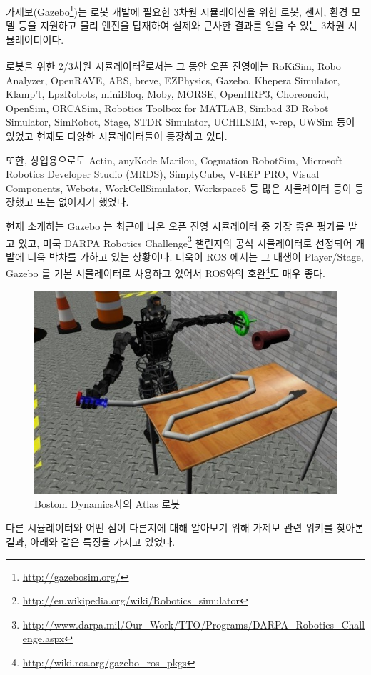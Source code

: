 가제보(Gazebo\footnote{\url{http://gazebosim.org/}})는 로봇 개발에 필요한 3차원 시뮬레이션을 위한 로봇, 센서, 환경 모델 등을 지원하고 물리 엔진을 탑재하여 실제와 근사한 결과를 얻을 수 있는 3차원 시뮬레이터이다. 

로봇을 위한 2/3차원 시뮬레이터\footnote{\url{http://en.wikipedia.org/wiki/Robotics_simulator}}로서는 그 동안 오픈 진영에는  RoKiSim, Robo Analyzer, OpenRAVE, ARS, breve, EZPhysics, Gazebo, Khepera Simulator, Klamp't, LpzRobots, miniBloq, Moby, MORSE, OpenHRP3, Choreonoid, OpenSim, ORCASim, Robotics Toolbox for MATLAB, Simbad 3D Robot Simulator, SimRobot, Stage, STDR Simulator, UCHILSIM, v-rep, UWSim 등이 있었고 현재도 다양한 시뮬레이터들이 등장하고 있다.

또한, 상업용으로도 Actin, anyKode Marilou, Cogmation RobotSim, Microsoft Robotics Developer Studio (MRDS), SimplyCube, V-REP PRO, Visual Components, Webots, WorkCellSimulator, Workspace5 등 많은 시뮬레이터 등이 등장했고 또는 없어지기 했었다. 

현재 소개하는 Gazebo 는 최근에 나온 오픈 진영 시뮬레이터 중 가장 좋은 평가를 받고 있고, 미국 DARPA Robotics Challenge\footnote{\url{http://www.darpa.mil/Our_Work/TTO/Programs/DARPA_Robotics_Challenge.aspx}} 챌린지의 공식 시뮬레이터로 선정되어 개발에 더욱 박차를 가하고 있는 상황이다. 더욱이 ROS 에서는 그 태생이 Player/Stage, Gazebo 를 기본 시뮬레이터로 사용하고 있어서 ROS와의 호완\footnote{\url{http://wiki.ros.org/gazebo_ros_pkgs}}도 매우 좋다.

\begin{figure}[h]
\centering\includegraphics[width=0.7\columnwidth]{pictures/chapter10/darpa_hose_atlas.jpg}
\caption{Bostom Dynamics사의 Atlas 로봇}
\end{figure}

다른 시뮬레이터와 어떤 점이 다른지에 대해 알아보기 위해 가제보 관련 위키를 찾아본 결과, 아래와 같은 특징을 가지고 있었다.

\setcounter{num}{0}

